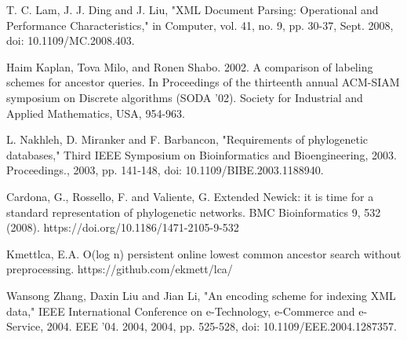 \documentclass{beamer}
\begin{document}
\begin{frame}
    \scriptsize

    T. C. Lam, J. J. Ding and J. Liu, "XML Document Parsing: Operational and Performance Characteristics," in Computer, vol. 41, no. 9, pp. 30-37, Sept. 2008, doi: 10.1109/MC.2008.403.

    Haim Kaplan, Tova Milo, and Ronen Shabo. 2002. A comparison of labeling schemes for ancestor queries. In Proceedings of the thirteenth annual ACM-SIAM symposium on Discrete algorithms (SODA '02). Society for Industrial and Applied Mathematics, USA, 954-963.

    L. Nakhleh, D. Miranker and F. Barbancon, "Requirements of phylogenetic databases," Third IEEE Symposium on Bioinformatics and Bioengineering, 2003. Proceedings., 2003, pp. 141-148, doi: 10.1109/BIBE.2003.1188940.

    Cardona, G., Rossello, F. and Valiente, G. Extended Newick: it is time for a standard representation of phylogenetic networks. BMC Bioinformatics 9, 532 (2008). https://doi.org/10.1186/1471-2105-9-532

    Kmettlca, E.A. O(log n) persistent online lowest common ancestor search without preprocessing. https://github.com/ekmett/lca/
    
    Wansong Zhang, Daxin Liu and Jian Li, "An encoding scheme for indexing XML data," IEEE International Conference on e-Technology, e-Commerce and e-Service, 2004. EEE '04. 2004, 2004, pp. 525-528, doi: 10.1109/EEE.2004.1287357.
\end{frame}
\end{document}

